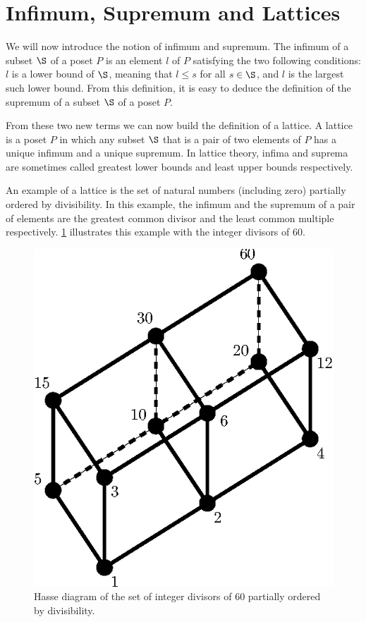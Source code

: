 \section{Infimum, Supremum and Lattices}
\label{tree:poset:lattices}

We will now introduce the notion of infimum and supremum. The infimum of a
subset \(\S\) of a poset \(P\) is an element \(l\) of \(P\) satisfying the two
following conditions: \(l\) is a lower bound of \(\S\), meaning that \(l \le
s\) for all \(s \in \S\), and \(l\) is the largest such lower bound. From this
definition, it is easy to deduce the definition of the supremum of a subset
\(\S\) of a poset \(P\).

From these two new terms we can now build the definition of a lattice. A
lattice is a poset \(P\) in which any subset \(\S\) that is a pair of two
elements of \(P\) has a unique infimum and a unique supremum. In lattice
theory, infima and suprema are sometimes called greatest lower bounds and least
upper bounds respectively.

An example of a lattice is the set of natural numbers (including zero)
partially ordered by divisibility. In this example, the infimum and the
supremum of a pair of elements are the greatest common divisor and the least
common multiple respectively. \ref{fig:poset:lattice:60div} illustrates this
example with the integer divisors of \(60\).

\begin{figure}
\center
\includegraphics[height=0.2\textheight]{fig/poset/lattice/60div}
\caption{Hasse diagram of the set of integer divisors of \(60\) partially ordered by
divisibility.}\label{fig:poset:lattice:60div}
\end{figure}
